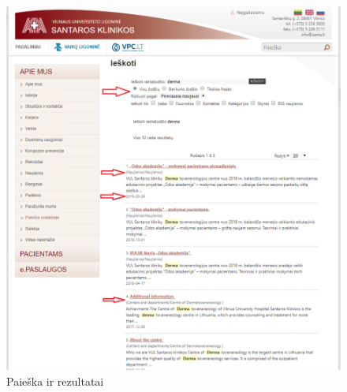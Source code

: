 \documentclass{VUMIFPSkursinis}
\begin{document}
\begin{figure}[H]
    \centering
    \includegraphics[scale=0.6]{img/PaieškosRezultatai}
    \caption{Paieška ir rezultatai}
    \label{img:paieškarez}
\end{figure}




\end{document}
